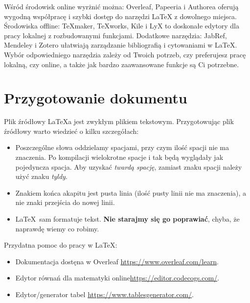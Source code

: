 Wśród środowisk online wyrżnić można: Overleaf, Papeeria i Authorea oferują wygodną współpracę i szybki dostęp do narzędzi LaTeX z dowolnego miejsca. Środowiska offline: TeXmaker, TeXworks, Kile i LyX to doskonałe edytory dla pracy lokalnej z rozbudowanymi funkcjami. Dodatkowe narzędzia: JabRef, Mendeley i Zotero ułatwiają zarządzanie bibliografią i cytowaniami w LaTeX. Wybór odpowiedniego narzędzia zależy od Twoich potrzeb, czy preferujesz pracę lokalną, czy online, a także jak bardzo zaawansowane funkcje są Ci potrzebne.


\section{Przygotowanie dokumentu}
\label{sec:przygotowanieDokumentu}

Plik źródłowy \LaTeX a jest zwykłym plikiem tekstowym. Przygotowując plik
źródłowy warto wiedzieć o kilku szczegółach:

\begin{itemize}
      \item
            Poszczególne słowa oddzielamy spacjami, przy czym ilość spacji nie ma znaczenia.
            Po kompilacji wielokrotne spacje i tak będą wyglądały jak pojedyncza spacja.
            Aby uzyskać {\em twardą spację}, zamiast znaku spacji należy użyć znaku {\em
                        tyldy}.

      \item
            Znakiem końca akapitu jest pusta linia (ilość pusty linii nie ma znaczenia), a
            nie znaki przejścia do nowej linii.

      \item
            \LaTeX~sam formatuje tekst. \textbf{Nie starajmy się go poprawiać}, chyba, że
            naprawdę wiemy co robimy.
\end{itemize}


\noindent Przydatna pomoc do pracy w \LaTeX:
\begin{itemize}
      \item Dokumentacja dostęna w Overleaf \url{https://www.overleaf.com/learn}.
      \item Edytor równań dla matematyki online\url{https://editor.codecogs.com/}.
      \item  Edytor/generator tabel \url{https://www.tablesgenerator.com/}.
\end{itemize}



